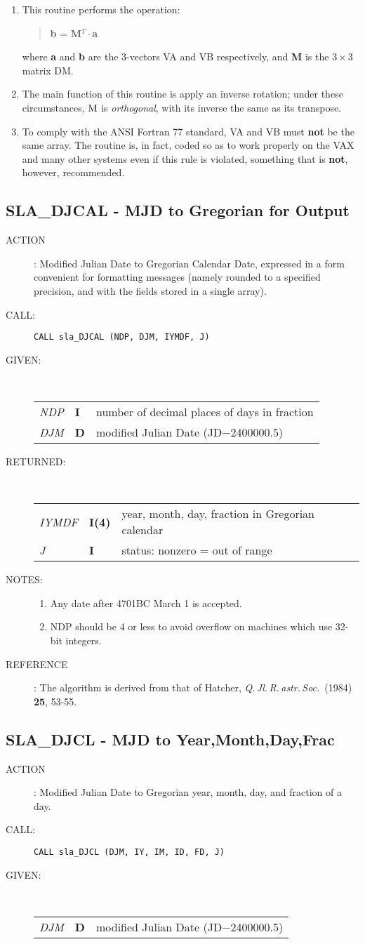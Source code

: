\documentclass[11pt,twoside]{article}
\newcommand{\xlabel}[1]{}
\newcommand{\routine}[3]
{\hbadness=10000
  \vbox
  {
    \rule{\textwidth}{0.3mm}\\
    {\Large {\bf #1} \hfill #2 \hfill {\bf #1}}\\
    \setlength{\oldspacing}{\topsep}
    \setlength{\topsep}{0.3ex}
    \begin{description}
      #3
    \end{description}
    \setlength{\topsep}{\oldspacing}
  }
}
\renewcommand{\routine}[3]
   {
      \subsection{#1\xlabel{#1} - #2\label{#1}}
       \begin{description}
         #3
       \end{description}
   }
\newcommand{\action}[1]
{\item[ACTION]: #1}
\newcommand{\action}[1]
   {\item[ACTION:] #1}
\newcommand{\call}[1]
{\item[CALL]: \hspace{0.4em}{\tt #1}}
\newlength{\oldspacing}
\renewcommand{\call}[1]
   {
    \item[CALL:] {\tt #1}
   }
\newcommand{\args}[2]
{
  \goodbreak
  \setlength{\oldspacing}{\topsep}
  \setlength{\topsep}{0.3ex}
  \begin{description}
  \item[#1]:\\[1.5ex]
    \begin{tabular}{p{7em}p{6em}p{22em}}
      #2
    \end{tabular}
  \end{description}
  \setlength{\topsep}{\oldspacing}
}
\renewcommand{\args}[2]
   {
     \begin{description}
        \item[#1:]\\
        \begin{tabular}{p{7em}p{6em}l}
           #2
        \end{tabular}
     \end{description}
   }
\newcommand{\spec}[3]
{
  {\em {#1}} & {\bf \mbox{#2}} & {#3}
}
\newcommand{\notes}[1]
{
  \goodbreak
  \setlength{\oldspacing}{\topsep}
  \setlength{\topsep}{0.3ex}
  \begin{description}
    \item[NOTES]:
        #1
  \end{description}
  \setlength{\topsep}{\oldspacing}
}
\renewcommand{\notes}[1]
   {
      \begin{description}
         \item[NOTES:]
            #1
      \end{description}
   }
\newcommand{\aref}[1]
{
  \goodbreak
  \setlength{\oldspacing}{\topsep}
  \setlength{\topsep}{0.3ex}
  \begin{description}
    \item[REFERENCE]:
        #1
  \end{description}
  \setlength{\topsep}{\oldspacing}
}
\newcommand{\aref}[1]
   {
     \begin{description}
       \item[REFERENCE:]
           #1
     \end{description}
   }
\begin{document}
{
 \begin{enumerate}
  \item This routine performs the operation:
        \begin{verse}
         {\bf b} = {\bf M}$^{T}\cdot${\bf a}
        \end{verse}
        where {\bf a} and {\bf b} are the 3-vectors VA and VB
        respectively, and  {\bf M} is the $3\times3$ matrix DM.
  \item The main function of this routine is apply an inverse
        rotation;  under these circumstances, ${\bf \rm M}$ is
        {\it orthogonal}, with its inverse the same as its transpose.
  \item To comply with the ANSI Fortran 77 standard, VA and VB must
        {\bf not} be the same array.  The routine is, in fact, coded
        so as to work properly on the VAX and many other systems even
        if this rule is violated, something that is {\bf not}, however,
        recommended.
 \end{enumerate}
}
\routine{SLA\_DJCAL}{MJD to Gregorian for Output}
{
 \action{Modified Julian Date to Gregorian Calendar Date, expressed
         in a form convenient for formatting messages (namely
         rounded to a specified precision, and with the fields
         stored in a single array).}
 \call{CALL sla\_DJCAL (NDP, DJM, IYMDF, J)}
}
\args{GIVEN}
{
 \spec{NDP}{I}{number of decimal places of days in fraction} \\
 \spec{DJM}{D}{modified Julian Date (JD$-$2400000.5)}
}
\args{RETURNED}
{
 \spec{IYMDF}{I(4)}{year, month, day, fraction in Gregorian calendar} \\
 \spec{J}{I}{status:  nonzero = out of range}
}
\notes
{
 \begin{enumerate}
  \item Any date after 4701BC March 1 is accepted.
  \item NDP should be 4 or less to avoid overflow on machines which
        use 32-bit integers.
 \end{enumerate}
}
\aref{The algorithm is derived from that of Hatcher,
      {\it Q.\,Jl.\,R.\,astr.\,Soc.}\ (1984) {\bf 25}, 53-55.}
\routine{SLA\_DJCL}{MJD to Year,Month,Day,Frac}
{
 \action{Modified Julian Date to Gregorian year, month, day,
         and fraction of a day.}
 \call{CALL sla\_DJCL (DJM, IY, IM, ID, FD, J)}
}
\args{GIVEN}
{
 \spec{DJM}{D}{modified Julian Date (JD$-$2400000.5)}
}
\end{document}
